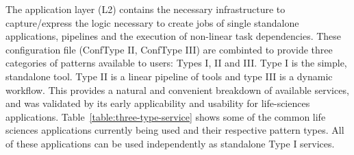 \documentclass[]{svjour3}
\begin{document}








The application layer (L2) contains the necessary infrastructure to
capture/express the logic necessary to create jobs of single
standalone applications, pipelines and the execution of non-linear
task dependencies.  These configuration file (ConfType II, ConfType
III) are combinted to provide three categories of patterns available
to users: Types I, II and III.  Type I is the simple, standalone tool.
Type II is a linear pipeline of tools and type III is a dynamic
workflow.  This provides a natural and convenient breakdown of
available services, and was validated by its early applicability and
usability for life-sciences applications.
Table~\ref{table:three-type-service} shows some of the common life
sciences applications currently being used and their respective
pattern types. All of these applications can be used independently as
standalone Type I services.


\end{document}
